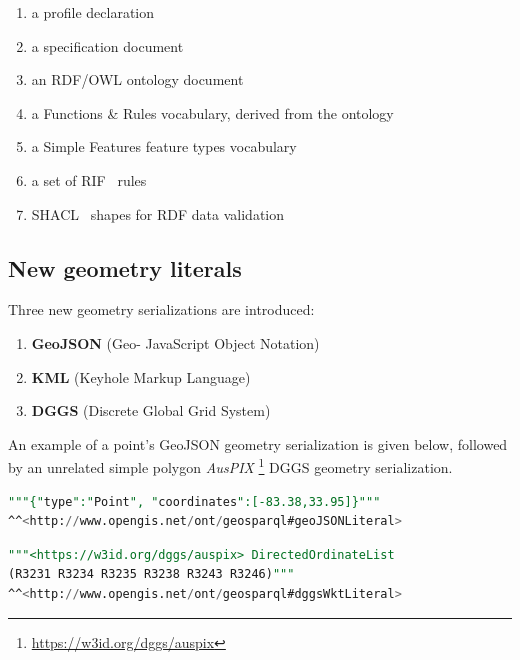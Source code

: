 \documentclass[runningheads]{llncs}
\begin{document}
\begin{enumerate}
    \item a profile declaration
    \item a specification document
    \item an RDF/OWL ontology document
    \item a Functions \& Rules vocabulary, derived from the ontology
    \item a Simple Features feature types vocabulary
    \item a set of RIF~\cite{kifer2013rif} rules
    \item SHACL~\cite{knublauch_shapes_2017} shapes for RDF data validation 
\end{enumerate}


\subsection{New geometry literals}\label{sec:newliterals}
Three new geometry serializations are introduced: 

\begin{enumerate}
    \item \textbf{GeoJSON} (Geo- JavaScript Object Notation)~\cite{butler2016geojson}
    \item \textbf{KML} (Keyhole Markup Language)~\cite{nolan2014keyhole} 
    \item \textbf{DGGS} (Discrete Global Grid System)~\cite{sahr1998discrete}
\end{enumerate} 

An example of a point's GeoJSON geometry serialization is given below, followed by an unrelated simple polygon \textit{AusPIX}
\footnote{\url{https://w3id.org/dggs/auspix}} DGGS geometry serialization.

\small
\begin{lstlisting}[caption=GeoJSON geometry serialization example,label=lst:geojsonliteral,language=sql,frame=single,basicstyle=\ttfamily,showstringspaces=false]
"""{"type":"Point", "coordinates":[-83.38,33.95]}"""
^^<http://www.opengis.net/ont/geosparql#geoJSONLiteral>
\end{lstlisting}

\begin{lstlisting}[caption=AusPIX DGGS geometry serialization example,label=lst:geodggsWktliteral,language=sql,frame=single,basicstyle=\ttfamily,showstringspaces=false]
"""<https://w3id.org/dggs/auspix> DirectedOrdinateList 
(R3231 R3234 R3235 R3238 R3243 R3246)"""
^^<http://www.opengis.net/ont/geosparql#dggsWktLiteral>
\end{lstlisting}
\normalsize
\end{document}
